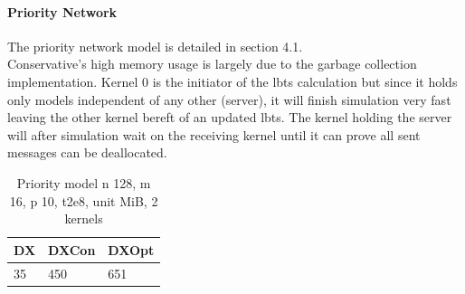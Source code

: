 \paragraph*{Priority Network}
The priority network model is detailed in section 4.1.\\
Conservative's high memory usage is largely due to the garbage collection implementation. Kernel 0 is the initiator of the lbts calculation but since it holds only models independent of any other (server), it will finish simulation very fast leaving the other kernel bereft of an updated lbts. The kernel holding the server will after simulation wait on the receiving kernel until it can prove all sent messages can be deallocated.
\begin{table}[lhtb]
	\centering
	\caption{Priority model n 128, m 16, p 10,  t2e8, unit MiB, 2 kernels}
	\label{pmod_mem}
	\begin{tabular}{| l | l | l |}
		\hline
		DX &DXCon &DXOpt\\ \hline
		35 & 450 & 651\\ \hline
	\end{tabular}
\end{table}
